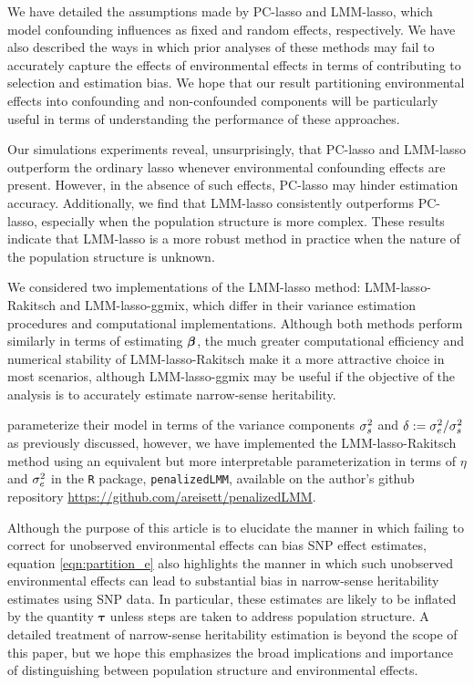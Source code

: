 We have detailed the assumptions made by PC-lasso and LMM-lasso, which model confounding influences as fixed and random effects, respectively. We have also described the ways in which prior analyses of these methods may fail to accurately capture the effects of environmental effects in terms of contributing to selection and estimation bias. We hope that our result partitioning environmental effects into confounding and non-confounded components will be particularly useful in terms of understanding the performance of these approaches.

Our simulations experiments reveal, unsurprisingly, that PC-lasso and LMM-lasso outperform the ordinary lasso whenever environmental confounding effects are present. However, in the absence of such effects, PC-lasso may hinder estimation accuracy. Additionally, we find that LMM-lasso consistently outperforms PC-lasso, especially when the population structure is more complex. These results indicate that LMM-lasso is a more robust method in practice when the nature of the population structure is unknown.

We considered two implementations of the LMM-lasso method: LMM-lasso-Rakitsch and LMM-lasso-ggmix, which differ in their variance estimation procedures and computational implementations. Although both methods perform similarly in terms of estimating $\boldsymbol{\beta}{}$, the much greater computational efficiency and numerical stability of LMM-lasso-Rakitsch make it a more attractive choice in most scenarios, although LMM-lasso-ggmix may be useful if the objective of the analysis is to accurately estimate narrow-sense heritability.

\citet{Rakitsch2012} parameterize their model in terms of the variance components $\sigma^2_s$ and $\delta := \sigma^2_e / \sigma^2_s$ as previously discussed, however, we have implemented the LMM-lasso-Rakitsch method using an equivalent but more interpretable parameterization in terms of $\eta$ and $\sigma^2_e$ in the \texttt{R} package, \texttt{penalizedLMM}, available on the author's github repository \url{https://github.com/areisett/penalizedLMM}.

Although the purpose of this article is to elucidate the manner in which failing to correct for unobserved environmental effects can bias SNP effect estimates, equation \eqref{eqn:partition_e} also highlights the manner in which such unobserved environmental effects can lead to substantial bias in narrow-sense heritability estimates using SNP data. In particular, these estimates are likely to be inflated by the quantity $\boldsymbol{\tau}$ unless steps are taken to address population structure. A detailed treatment of narrow-sense heritability estimation is beyond the scope of this paper, but we hope this emphasizes the broad implications and importance of distinguishing between population structure and environmental effects.

